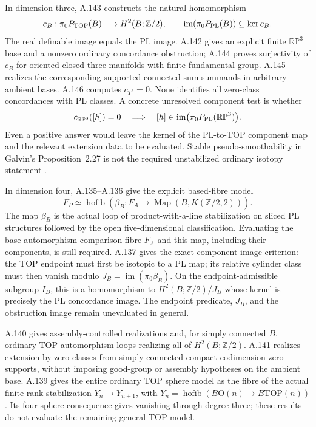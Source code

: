 \begin{enumerate}
In dimension three, A.143 constructs the natural homomorphism
\[
 c_B:\pi_0P_{\rm TOP}(B)\longrightarrow H^2(B;\mathbb Z/2),
 \qquad \operatorname{im}(\pi_0P_{\rm PL}(B))\subseteq\ker c_B.
\]
The real definable image equals the PL image. A.142 gives an explicit
finite $\mathbb {RP}^3$ base and a nonzero ordinary concordance obstruction;
A.144 proves surjectivity of $c_B$ for oriented closed three-manifolds
with finite fundamental group. A.145 realizes the corresponding supported
connected-sum summands in arbitrary ambient bases. A.146 computes
$c_{T^3}=0$. None identifies all zero-class concordances with PL classes.
A concrete unresolved component test is whether
\[
 c_{\mathbb {RP}^3}([h])=0
 \quad\Longrightarrow\quad
 [h]\in\operatorname{im}\bigl(\pi_0P_{\rm PL}(\mathbb {RP}^3)\bigr).
\]
Even a positive answer would leave the kernel of the PL-to-TOP component
map and the relevant extension data to be evaluated. Stable
pseudo-smoothability in Galvin's Proposition~2.27 is not the required
unstabilized ordinary isotopy statement \cite{Galvin2026}.

In dimension four, A.135--A.136 give the explicit based-fibre model
\[
 F_P\simeq\operatorname{hofib}\!\left(
 \beta_B:F_A\longrightarrow\operatorname{Map}(B,K(\mathbb Z/2,2))
 \right).
\]
The map $\beta_B$ is the actual loop of product-with-a-line stabilization
on sliced PL structures followed by the open five-dimensional
classification. Evaluating the base-automorphism comparison fibre $F_A$
and this map, including their components, is still required. A.137 gives
the exact component-image criterion: the TOP endpoint must first be
isotopic to a PL map; its relative cylinder class must then vanish modulo
$J_B=\operatorname{im}(\pi_0\beta_B)$. On the endpoint-admissible subgroup
$I_B$, this is a homomorphism to $H^2(B;\mathbb Z/2)/J_B$ whose kernel is
precisely the PL concordance image. The endpoint predicate, $J_B$, and
the obstruction image remain unevaluated in general.

A.140 gives assembly-controlled realizations and, for simply connected
$B$, ordinary TOP automorphism loops realizing all of $H^2(B;\mathbb Z/2)$.
A.141 realizes extension-by-zero classes from simply connected compact
codimension-zero supports, without imposing good-group or assembly
hypotheses on the ambient base. A.139 gives the entire ordinary TOP
sphere model as the fibre of the actual finite-rank stabilization
$Y_n\to Y_{n+1}$, with
$Y_n=\operatorname{hofib}(B\mathrm O(n)\to B\mathrm{TOP}(n))$.
Its four-sphere consequence gives vanishing through degree three;
these results do not evaluate the remaining general TOP model.


\end{enumerate}

